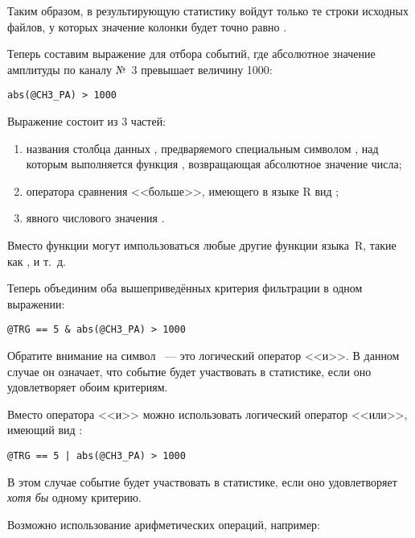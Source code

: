 Таким образом, в результирующую статистику войдут только те строки исходных файлов, у которых значение колонки  будет точно равно .

\bigskip

Теперь составим выражение для отбора событий, где абсолютное значение амплитуды по каналу №~3 превышает величину 1000:

\begin{lstlisting}
abs(@CH3_PA) > 1000
\end{lstlisting}

Выражение состоит из 3 частей:

\begin{enumerate}
\item названия столбца данных , предваряемого специальным символом , над которым выполняется функция , возвращающая абсолютное значение числа;
\item оператора сравнения <<больше>>, имеющего в языке R вид \CMDARG{>};
\item явного числового значения .
\end{enumerate}

Вместо функции  могут импользоваться любые другие функции языка~R, такие как ,  и т.~д.

\bigskip

Теперь объединим оба вышеприведённых критерия фильтрации в одном выражении:

\begin{lstlisting}
@TRG == 5 & abs(@CH3_PA) > 1000
\end{lstlisting}

Обратите внимание на символ \CMDARG{\&}~--- это логический оператор <<и>>. В данном случае он означает, что событие будет участвовать в статистике, если оно удовлетворяет обоим критериям.

Вместо оператора <<и>> можно использовать логический оператор <<или>>, имеющий вид \CMDARG{|}:

\begin{lstlisting}
@TRG == 5 | abs(@CH3_PA) > 1000
\end{lstlisting}

В этом случае событие будет участвовать в статистике, если оно удовлетворяет {\it хотя бы} одному критерию.

\bigskip

Возможно использование арифметических операций, например:

